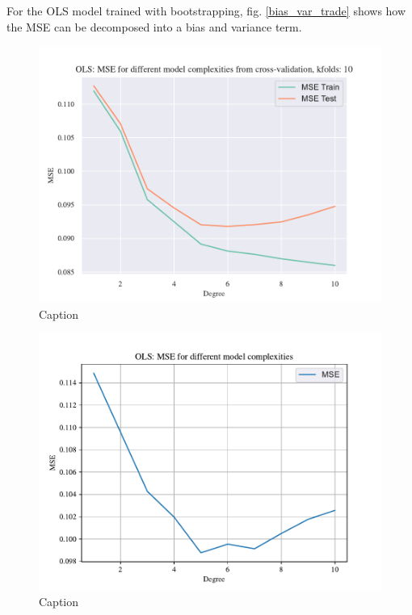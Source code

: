 For the OLS model trained with bootstrapping, fig. \ref{bias_var_trade} shows how the MSE can be decomposed into a bias and variance term. 

\begin{figure}[h!]
    \centering
    \includegraphics[width=1\linewidth]{project_1_alt/figures/data/OLS_MSE_Franke_Noise_CV_k10.pdf}
    \caption{Caption}
    \label{fig:frankek10}
\end{figure}



\begin{figure}
    \centering
    \includegraphics[width=1\linewidth]{project_1_alt/figures/data/OLS_MSE_Franke_Noise_bootstrap.pdf}
    \caption{Caption}
    \label{fig:olsfrankebootstrap}
\end{figure}

